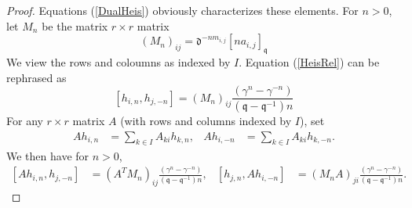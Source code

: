 \documentclass{amsart}
\newcommand{\qqq}{\mathfrak{q}}
\newcommand{\ddd}{\mathfrak{d}}
\theoremstyle{remark}
\numberwithin{thm}{section}
\numberwithin{equation}{section}
\begin{document}
\begin{proof}
    Equations (\ref{DualHeis}) obviously characterizes these elements.
    For $n>0$, let $M_n$ be the matrix $r\times r$ matrix
    \[
    \left(M_n\right)_{ij}=\ddd^{-nm_{i,j}}[na_{i,j}]_{\qqq}
    \]
    We view the rows and coloumns as indexed by $I$.
    Equation (\ref{HeisRel}) can be rephrased as
    \[
        [h_{i,n}, h_{j,-n}]= \left(M_{n}\right)_{ij}\frac{(\gamma^n-\gamma^{-n})}{(\qqq-\qqq^{-1})n}
    \]
    For any $r\times r$ matrix $A$ (with rows and columns indexed by $I$), set
    \begin{align*}
        Ah_{i,n}&=\sum_{k\in I}A_{ki}h_{k,n},&
        Ah_{i,-n}&=\sum_{k\in I}A_{ki}h_{k,-n}.
    \end{align*}
    We then have for $n>0$,
    \begin{align*}
        \left[Ah_{i,n}, h_{j,-n}\right]&=(A^TM_n)_{ij}\frac{(\gamma^n-\gamma^{-n})}{(\qqq-\qqq^{-1})n},&
        \left[h_{j,n}, Ah_{i,-n}\right]&=\left(M_nA\right)_{ji}\frac{(\gamma^n-\gamma^{-n})}{(\qqq-\qqq^{-1})n}.
    \end{align*}


\end{proof}
\end{document}
